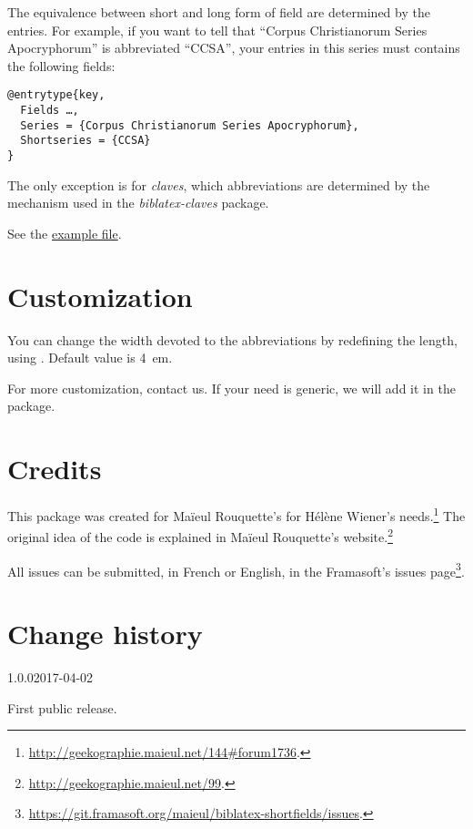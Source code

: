 \documentclass{ltxdockit}[2011/03/25]
\begin{document}
The equivalence between short and long form of field are determined by the entries.
For example, if you want to tell that \enquote{Corpus Christianorum Series Apocryphorum} is abbreviated \enquote{CCSA}, your entries in this series must contains the following fields:
\begin{verbatim}
@entrytype{key,
  Fields …,
  Series = {Corpus Christianorum Series Apocryphorum},
  Shortseries = {CCSA}
}
\end{verbatim}

The only exception is for \emph{claves}, which abbreviations are determined by the mechanism used in the \emph{biblatex-claves} package.


See the \href{./example-biblatex-shortfields.tex}{example file}.

\section{Customization}

You can change the width devoted to the abbreviations by redefining the  length, using . Default value is 4~em.

For more customization, contact us. If your need is generic, we will add it in the package.

\section{Credits}



This package was created for Maïeul Rouquette's for Hélène Wiener's needs.\footnote{\url{http://geekographie.maieul.net/144\#forum1736}.} The original idea of the code is explained in Maïeul Rouquette's website.\footnote{\url{http://geekographie.maieul.net/99}.}


All issues can be submitted, in French or English, in the Framasoft's issues page\footnote{\url{https://git.framasoft.org/maieul/biblatex-shortfields/issues}.}.


\section{Change history}


\begin{changelog}

\begin{release}{1.0.0}{2017-04-02}
  \item First public release.
\end{release}

\end{changelog}
\end{document}
